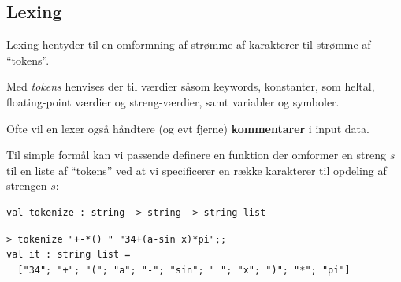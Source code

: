 \documentclass[rgb]{beamer}
\begin{document}
\subsection{Lexing}

\begin{frame}[fragile]
\begin{footnotesize}


  Lexing hentyder til en omformning af strømme af karakterer til strømme af ``tokens''.

  \vspace{1ex}

  Med \emph{tokens} henvises der til værdier såsom keywords,
  konstanter, som heltal, floating-point værdier og streng-værdier,
  samt variabler og symboler.

  \vspace{1ex}

  Ofte vil en lexer også håndtere (og evt fjerne) \textbf{kommentarer} i input
  data.

  \vspace{1ex}

  Til simple formål kan vi passende definere en funktion der omformer en
  streng $s$ til en liste af ``tokens'' ved at vi specificerer en
  række karakterer til opdeling af strengen $s$:

\begin{lstlisting}[numbers=none,frame=none,mathescape]
  val tokenize : string -> string -> string list
\end{lstlisting}

\begin{lstlisting}[numbers=none,frame=none,mathescape]
> tokenize "+-*() " "34+(a-sin x)*pi";;
val it : string list =
  ["34"; "+"; "("; "a"; "-"; "sin"; " "; "x"; ")"; "*"; "pi"]
\end{lstlisting}
\end{footnotesize}
\end{frame}
\end{document}
